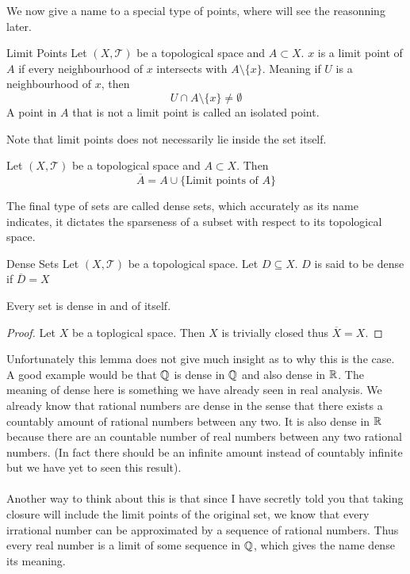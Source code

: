 \documentclass[a4paper]{article}
\begin{document}
We now give a name to a special type of points, where will see the reasonning later. 

\begin{defn}{Limit Points}{} Let $(X,\mathcal{T})$ be a topological space and $A\subset X$. $x$ is a limit point of $A$ if every neighbourhood of $x$ intersects with $A\setminus\{x\}$. Meaning if $U$ is a neighbourhood of $x$, then $$U\cap A\setminus\{x\}\neq\emptyset$$ A point in $A$ that is not a limit point is called an isolated point. 
\end{defn}

Note that limit points does not necessarily lie inside the set itself. 

\begin{prp}{}{} Let $(X,\mathcal{T})$ be a topological space and $A\subset X$. Then $$\overline{A}=A\cup\{\text{Limit points of }A\}$$
\end{prp}

The final type of sets are called dense sets, which accurately as its name indicates, it dictates the sparseness of a subset with respect to its topological space. 

\begin{defn}{Dense Sets}{} Let $(X,\mathcal{T})$ be a topological space. Let $D\subseteq X$. $D$ is said to be dense if $\overline{D}=X$
\end{defn}

\begin{lmm}{}{} Every set is dense in and of itself. \tcbline
\begin{proof}
Let $X$ be a toplogical space. Then $X$ is trivially closed thus $\overline{X}=X$. 
\end{proof}
\end{lmm}

Unfortunately this lemma does not give much insight as to why this is the case. A good example would be that $\mathbb{Q}$ is dense in $\mathbb{Q}$ and also dense in $\mathbb{R}$. The meaning of dense here is something we have already seen in real analysis. We already know that rational numbers are dense in the sense that there exists a countably amount of rational numbers between any two. It is also dense in $\mathbb{R}$ because there are an countable number of real numbers between any two rational numbers. (In fact there should be an infinite amount instead of countably infinite but we have yet to seen this result). \\~\\
Another way to think about this is that since I have secretly told you that taking closure will include the limit points of the original set, we know that every irrational number can be approximated by a sequence of rational numbers. Thus every real number is a limit of some sequence in $\mathbb{Q}$, which gives the name dense its meaning. 
\end{document}
